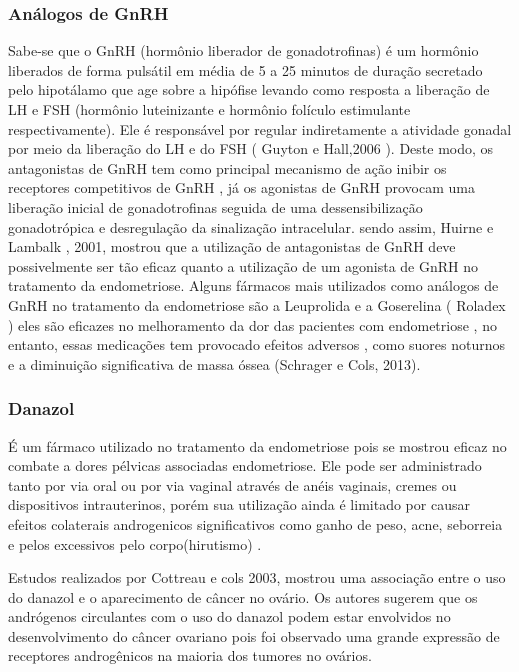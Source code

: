 \documentclass[12pt]{article} %
\begin{document}
\subsubsection{Análogos de GnRH}

Sabe-se que o GnRH (hormônio liberador de gonadotrofinas) é um hormônio liberados de forma pulsátil em média de 5 a 25 minutos de duração secretado pelo hipotálamo que age sobre a hipófise levando como resposta a liberação de LH e FSH (hormônio luteinizante e hormônio folículo estimulante respectivamente). Ele é responsável por regular indiretamente a atividade gonadal por meio da liberação do LH e do FSH ( Guyton e Hall,2006 ). Deste modo, os antagonistas de GnRH tem como principal mecanismo de ação inibir os receptores competitivos de GnRH , já os agonistas de GnRH provocam uma liberação inicial de gonadotrofinas seguida de uma dessensibilização gonadotrópica e desregulação da sinalização intracelular. sendo assim, Huirne  e Lambalk , 2001, mostrou que a utilização de antagonistas de GnRH deve possivelmente ser tão eficaz quanto a utilização de um agonista de GnRH no tratamento da endometriose.
Alguns fármacos mais utilizados como análogos de GnRH no tratamento da endometriose são a Leuprolida e a Goserelina ( Roladex ) eles são eficazes no melhoramento da dor das pacientes com endometriose , no entanto, essas medicações tem provocado efeitos adversos , como suores noturnos e a diminuição significativa de massa óssea (Schrager e Cols, 2013). 

\subsubsection{Danazol}

É um fármaco utilizado no tratamento da endometriose pois se mostrou eficaz no combate a dores pélvicas associadas endometriose. Ele pode ser administrado tanto por via oral ou por via vaginal através de anéis vaginais, cremes ou dispositivos intrauterinos, porém sua utilização ainda é limitado por causar efeitos colaterais androgenicos significativos como ganho de peso, acne, seborreia e pelos excessivos pelo corpo(hirutismo) .

Estudos realizados por Cottreau e cols 2003, mostrou uma associação entre o uso do danazol e o aparecimento de câncer no ovário. Os autores sugerem que os andrógenos circulantes com o uso do danazol podem estar envolvidos no desenvolvimento do câncer ovariano pois foi observado uma grande expressão de receptores androgênicos na maioria dos tumores no ovários.
\end{document}
